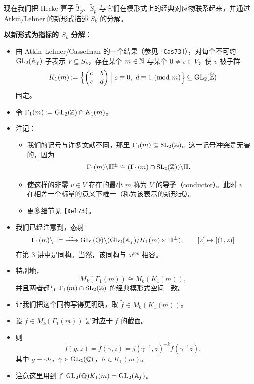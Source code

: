现在我们把 Hecke 算子 $\tilde T_p$、$\tilde S_p$ 与它们在模形式上的经典对应物联系起来，并通过 Atkin/Lehner 的新形式描述 $S_k$ 的分解。

\textbf{以新形式为指标的 $S_k$ 分解}：
\begin{itemize}
\item 由 Atkin--Lehner/Casselman 的一个结果（参见 \texttt{[Cas73]}），对每个不可约 $\operatorname{GL}_2(\mathbb{A}_f)$-子表示 $V\subseteq S_k$，存在某个 $m\in\mathbb{N}$ 与某个 $0\neq v\in V$，使 $v$ 被子群
\[
K_1(m):=\Bigl\{\begin{pmatrix}a&b\\c&d\end{pmatrix}\Bigm|c\equiv0,\ d\equiv1\ (\mathrm{mod}\ m)\Bigr\}\subseteq\GL_2(\widehat\Z)
\]
固定。
\item 令 $\Gamma_1(m):=\operatorname{GL}_2(\mathbb{Z})\cap K_1(m)$。
\item 注记：
\begin{itemize}
\item 我们的记号与许多文献不同，那里 $\Gamma_1(m)\subseteq\operatorname{SL}_2(\mathbb{Z})$。这一记号冲突是无害的，因为
\[
\Gamma_1(m)\backslash\mathbb{H}^\pm\cong(\Gamma_1(m)\cap\operatorname{SL}_2(\mathbb{Z}))\backslash\mathbb{H}.
\]
\item 使这样的非零 $v\in V$ 存在的最小 $m$ 称为 $V$ 的\textbf{导子}（conductor）。此时 $v$ 在相差一个标量的意义下唯一（称为该表示的新形式）。
\item 更多细节见 \texttt{[Del73]}。
\end{itemize}
\item 我们已经注意到，态射
\[
\Gamma_1(m)\backslash\HH^\pm\xrightarrow{\ \sim\ }\GL_2(\Q)\backslash(\GL_2(\Af)/K_1(m)\times\HH^\pm),\qquad
[z]\mapsto[(1,z)]
\]
在第 3 讲中是同构。当然，该同构与 $\omega^{\otimes k}$ 相容。
\item 特别地，
\[
M_k(\Gamma_1(m))\cong M_k(K_1(m)),
\]
并且两者都与 $\Gamma_1(m)\cap\operatorname{SL}_2(\mathbb{Z})$ 的经典模形式空间一致。
\item 让我们把这个同构写得更明确，取 $\tilde f\in M_k(K_1(m))$。
\item 设 $f\in M_k(\Gamma_1(m))$ 是对应于 $\tilde f$ 的截面。
\item 则
\[
\tilde f(g,z)=\tilde f(\gamma,z)=j(\gamma^{-1},z)^{-k}f(\gamma^{-1}z),
\]
其中 $g=\gamma h$，$\gamma\in\operatorname{GL}_2(\mathbb{Q})$，$h\in K_1(m)$。
\item 注意这里用到了 $\operatorname{GL}_2(\mathbb{Q})K_1(m)=\operatorname{GL}_2(\mathbb{A}_f)$。

\end{itemize}
